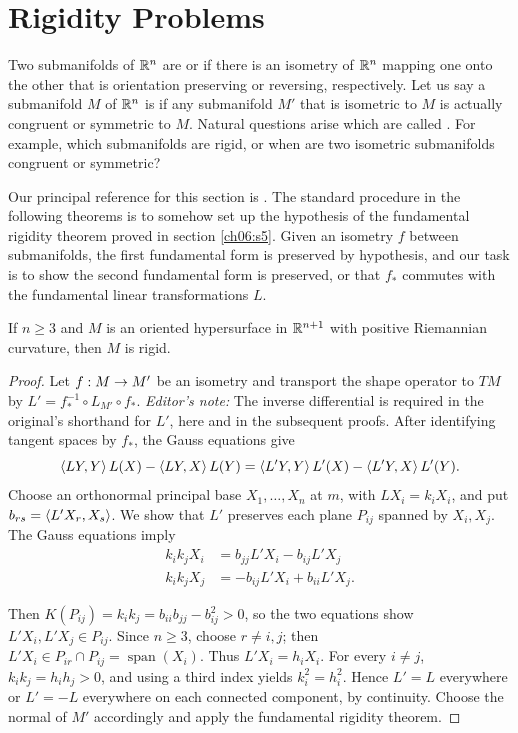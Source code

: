 \documentclass[../main]{subfiles}
\begin{document}
\section{Rigidity Problems}\label{ch08:s5}

Two submanifolds of $\mathbb{R}^n$ are  or  if there is an isometry of $\mathbb{R}^n$ mapping one onto the other that is orientation preserving or reversing, respectively. Let us say a submanifold $M$ of $\mathbb{R}^n$ is  if any submanifold $M'$ that is isometric to $M$ is actually congruent or symmetric to $M$. Natural questions arise which are called . For example, which submanifolds are rigid, or when are two isometric submanifolds congruent or symmetric?

Our principal reference for this section is \cite{chern1951topics}. The standard procedure in the following theorems is to somehow set up the hypothesis of the fundamental rigidity theorem proved in section \ref{ch06:s5}. Given an isometry $f$ between submanifolds, the first fundamental form is preserved by hypothesis, and our task is to show the second fundamental form is preserved, or that $f_*$ commutes with the fundamental linear transformations $L$.


\begin{theorem} \label{thm:ch8.5.1}
If $n \geq 3$ and $M$ is an oriented hypersurface in $\mathbb{R}^{n+1}$ with positive Riemannian curvature, then $M$ is rigid.
\end{theorem}

\begin{proof}
Let $f:M\to M'$ be an isometry and transport the shape operator to $TM$ by $L'=f_\ast^{-1}\circ L_{M'}\circ f_\ast$. \emph{Editor's note:} The inverse differential is required in the original's shorthand for $L'$, here and in the subsequent proofs. After identifying tangent spaces by $f_\ast$, the Gauss equations give
\[\left\langle LY,Y\right\rangle L(X)-\left\langle LY,X\right\rangle L(Y)=\left\langle L'Y,Y\right\rangle L'(X)-\left\langle L'Y,X\right\rangle L'(Y).\]
Choose an orthonormal principal base $X_1,\dots,X_n$ at $m$, with $LX_i=k_iX_i$, and put $b_{rs}=\left\langle L'X_r,X_s\right\rangle$. We show that $L'$ preserves each plane $P_{ij}$ spanned by $X_i,X_j$. The Gauss equations imply
\begin{align*}
    k_i k_j X_i&=b_{j j} L' X_i-b_{i j} L' X_j\\
    k_i k_j X_j&=-b_{i j} L' X_i+b_{i i} L' X_j.
\end{align*}

Then $K(P_{ij})=k_ik_j=b_{ii}b_{jj}-b_{ij}^2>0$, so the two equations show $L'X_i,L'X_j\in P_{ij}$. Since $n\geq3$, choose $r\neq i,j$; then $L'X_i\in P_{ir}\cap P_{ij}=\operatorname{span}(X_i)$. Thus $L'X_i=h_iX_i$. For every $i\neq j$, $k_ik_j=h_ih_j>0$, and using a third index yields $k_i^2=h_i^2$. Hence $L'=L$ everywhere or $L'=-L$ everywhere on each connected component, by continuity. Choose the normal of $M'$ accordingly and apply the fundamental rigidity theorem.
\end{proof}
\end{document}
